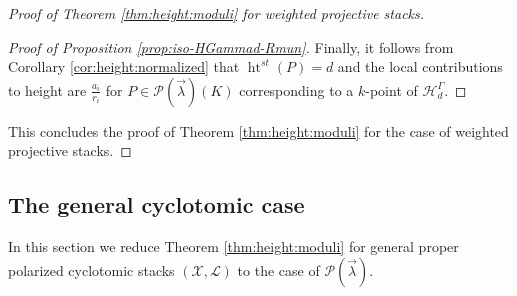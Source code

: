 \documentclass[a4paper,12pt]{amsart}
\theoremstyle{definition}
\newcommand{\cX}{\mathcal{X}}
\newcommand{\cL}{\mathcal{L}}
\newcommand{\cH}{\mathcal{H}}
\DeclareMathOperator{\height}{ht}
\newcommand{\Pcv}{\mathcal{P}(\vec{\lambda})}
\begin{document}
\begin{proof}[{Proof of Theorem \ref{thm:height:moduli} for weighted projective stacks}]
\begin{proof}[Proof of Proposition \ref{prop:iso-HGammad-Rmun}]
			Finally, it follows from Corollary \ref{cor:height:normalized} that $\height^{st}(P) = d$ and the local contributions to height are $\frac{a_i}{r_i}$ for $P \in \Pcv(K)$ corresponding to a $k$-point of $\cH^\Gamma_d$. 
		\end{proof}
		
		
		
		This concludes the proof of Theorem \ref{thm:height:moduli} for the case of weighted projective stacks.
	\end{proof} 
	
	\subsection{The general cyclotomic case}
	
	In this section we reduce Theorem \ref{thm:height:moduli} for general proper polarized cyclotomic stacks $(\cX, \cL)$ to the case of $\Pcv$. 
	
\end{document}
